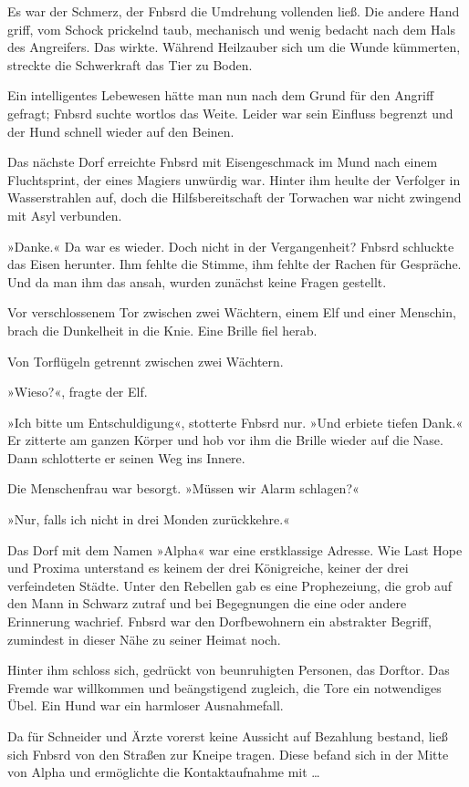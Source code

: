 Es war der Schmerz, der Fnbsrd die Umdrehung vollenden ließ. Die andere Hand griff, vom Schock prickelnd taub, mechanisch und wenig bedacht nach dem Hals des Angreifers. Das wirkte. Während Heilzauber sich um die Wunde kümmerten, streckte die Schwerkraft das Tier zu Boden.

Ein intelligentes Lebewesen hätte man nun nach dem Grund für den Angriff gefragt; Fnbsrd suchte wortlos das Weite. Leider war sein Einfluss begrenzt und der Hund schnell wieder auf den Beinen.

Das nächste Dorf erreichte Fnbsrd mit Eisengeschmack im Mund nach einem Fluchtsprint, der eines Magiers unwürdig war. Hinter ihm heulte der Verfolger in Wasserstrahlen auf, doch die Hilfsbereitschaft der Torwachen war nicht zwingend mit Asyl verbunden.

»Danke.« Da war es wieder. Doch nicht in der Vergangenheit? Fnbsrd schluckte das Eisen herunter. Ihm fehlte die Stimme, ihm fehlte der Rachen für Gespräche. Und da man ihm das ansah, wurden zunächst keine Fragen gestellt.

Vor verschlossenem Tor zwischen zwei Wächtern, einem Elf und einer Menschin, brach die Dunkelheit in die Knie. Eine Brille fiel herab.

Von Torflügeln getrennt zwischen zwei Wächtern.

»Wieso?«, fragte der Elf.

»Ich bitte um Entschuldigung«, stotterte Fnbsrd nur. »Und erbiete tiefen Dank.« Er zitterte am ganzen Körper und hob vor ihm die Brille wieder auf die Nase. Dann schlotterte er seinen Weg ins Innere.

Die Menschenfrau war besorgt. »Müssen wir Alarm schlagen?«

»Nur, falls ich nicht in drei Monden zurückkehre.«

Das Dorf mit dem Namen »Alpha« war eine erstklassige Adresse. Wie Last Hope und Proxima unterstand es keinem der drei Königreiche, keiner der drei verfeindeten Städte. Unter den Rebellen gab es eine Prophezeiung, die grob auf den Mann in Schwarz zutraf und bei Begegnungen die eine oder andere Erinnerung wachrief. Fnbsrd war den Dorfbewohnern ein abstrakter Begriff, zumindest in dieser Nähe zu seiner Heimat noch.

Hinter ihm schloss sich, gedrückt von beunruhigten Personen, das Dorftor. Das Fremde war willkommen und beängstigend zugleich, die Tore ein notwendiges Übel. Ein Hund war ein harmloser Ausnahmefall.

Da für Schneider und Ärzte vorerst keine Aussicht auf Bezahlung bestand, ließ sich Fnbsrd von den Straßen zur Kneipe tragen. Diese befand sich in der Mitte von Alpha und ermöglichte die Kontaktaufnahme mit …


